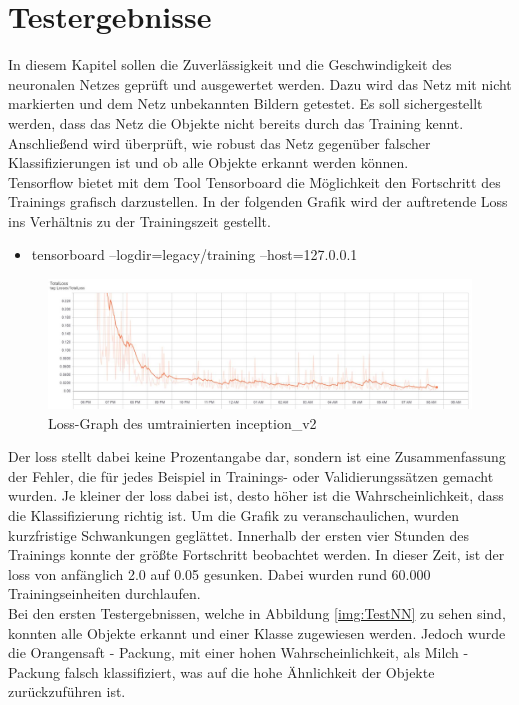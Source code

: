\documentclass[a4paper,12pt,oneside]{article}
\begin{document}
\section{Testergebnisse}
In diesem Kapitel sollen die Zuverlässigkeit und die Geschwindigkeit des neuronalen Netzes geprüft und ausgewertet werden. Dazu wird das Netz mit nicht markierten und dem Netz unbekannten Bildern getestet. Es soll sichergestellt werden, dass das Netz die Objekte nicht bereits durch das Training kennt. Anschließend wird überprüft, wie robust das Netz gegenüber falscher Klassifizierungen ist und ob alle Objekte erkannt werden können. 
\\
Tensorflow bietet mit dem Tool Tensorboard die Möglichkeit den Fortschritt des Trainings grafisch darzustellen. In der folgenden Grafik wird der auftretende \glqq Loss \glqq ins Verhältnis zu der Trainingszeit gestellt. 
\\
\begin{itemize}
\item tensorboard --logdir=legacy/training --host=127.0.0.1
\end{itemize}
\begin{figure}
    [h]
	\centering
	\includegraphics[scale=0.4]{Sources/loss_graph_200000.jpg}
	\caption{Loss-Graph des umtrainierten inception\_v2}
	\label{img:loss_graph_200000}
\end{figure}
Der \glqq loss\grqq{} stellt dabei keine Prozentangabe dar, sondern ist eine Zusammenfassung der Fehler, die für jedes Beispiel in Trainings- oder Validierungssätzen gemacht wurden. Je kleiner der \glqq loss\grqq{} dabei ist, desto höher ist die Wahrscheinlichkeit, dass die Klassifizierung richtig ist. Um die Grafik zu veranschaulichen, wurden kurzfristige Schwankungen geglättet. Innerhalb der ersten vier Stunden des Trainings konnte der größte Fortschritt beobachtet werden. In dieser Zeit, ist der \glqq loss\grqq{} von anfänglich 2.0 auf 0.05 gesunken. Dabei wurden rund 60.000 Trainingseinheiten durchlaufen.\\
Bei den ersten Testergebnissen, welche in Abbildung \ref{img:TestNN} zu sehen sind, konnten alle Objekte erkannt und einer Klasse zugewiesen werden. Jedoch wurde die \glqq Orangensaft - Packung\grqq , mit einer hohen Wahrscheinlichkeit, als \glqq Milch - Packung\grqq{} falsch klassifiziert, was auf die hohe Ähnlichkeit der Objekte zurückzuführen ist.\\
\end{document}
